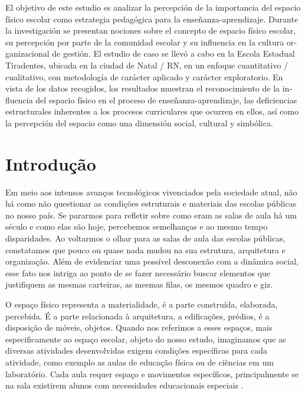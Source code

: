 \begin{refsection}

    \begin{otherlanguage}{spanish}

        \begin{galoResumo}[Resumén]
            El objetivo de este estudio es analizar la percepción de la importancia del espacio físico escolar como estrategia pedagógica para la enseñanza-aprendizaje. Durante la investigación se presentan nociones sobre el concepto de espacio físico escolar, su percepción por parte de la comunidad escolar y su influencia en la cultura organizacional de gestión. El estudio de caso se llevó a cabo en la Escola Estadual Tiradentes, ubicada en la ciudad de Natal / RN, en un enfoque cuantitativo / cualitativo, con metodología de carácter aplicado y carácter exploratorio. En vista de los datos recogidos, los resultados muestran el reconocimiento de la influencia del espacio físico en el proceso de enseñanza-aprendizaje, las deficiencias estructurales inherentes a los procesos curriculares que ocurren en ellos, así como la percepción del espacio como una dimensión social, cultural y simbólica.
        \end{galoResumo}
        
    \end{otherlanguage}

    \section{Introdução}

    Em meio aos intensos avanços tecnológicos vivenciados pela sociedade atual, não há como não questionar as condições estruturais e materiais das escolas públicas no nosso país. Se pararmos para refletir sobre como eram as salas de aula há um século e como elas são hoje, percebemos semelhanças e ao mesmo tempo disparidades. Ao voltarmos o olhar para as salas de aula das escolas públicas, constatamos que pouco ou quase nada mudou na sua estrutura, arquitetura e organização. Além de evidenciar uma possível desconexão com a dinâmica social, esse fato nos intriga ao ponto de se fazer necessário buscar elementos que justifiquem as mesmas carteiras, as mesmas filas, os mesmos quadro e giz. 

    O espaço físico representa a materialidade, é a parte construída, elaborada, percebida. É a parte relacionada à arquitetura, a edificações, prédios, é a disposição de móveis, objetos. Quando nos referimos a esses espaços, mais especificamente ao espaço escolar, objeto do nosso estudo, imaginamos que as diversas atividades desenvolvidas exigem condições específicas para cada atividade, como exemplo as aulas de educação física ou de ciências em um laboratório. Cada aula requer espaço e movimentos específicos, principalmente se na sala existirem alunos com necessidades educacionais especiais \cite{CARPINTEROAndALMEIDA2009Teorias}. 


\end{refsection}

